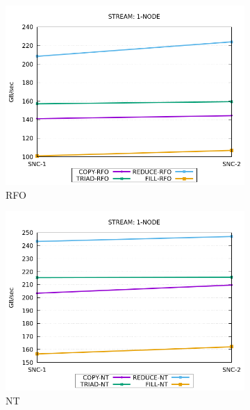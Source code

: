 \documentclass{article}
\begin{document}
\begin{figure}[!hb]
    \centering
    \begin{subfigure}[!hb]{0.3\textwidth}
         \centering
         \includegraphics[width=\textwidth]{../data/clx-8280l-snc/mem_bw_node/mb_node_rfo}
         \caption{RFO}
         \label{figure:mem_bw_node_rfo_clx_snc}
    \end{subfigure}
    \begin{subfigure}[!hb]{0.3\textwidth}
         \centering
         \includegraphics[width=\textwidth]{../data/clx-8280l-snc/mem_bw_node/mb_node_nt}
         \caption{NT}
         \label{figure:mem_bw_node_nt_clx_snc}
    \end{subfigure}
    \begin{subfigure}[!hb]{0.3\textwidth}

\end{subfigure}
\end{figure}
\end{document}
